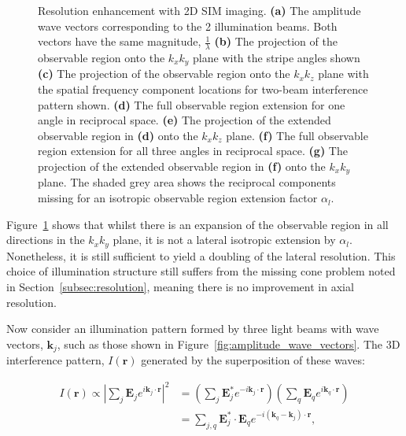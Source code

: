 \begin{figure}
\begin{subfigure}[t]{0.5\textwidth}
		\caption{}
		\label{fig:3D_SIM_OTF_xy_expansion_w_double_rad_filled}
	\end{subfigure}
	\caption[Resolution enhancement with 2D SIM imaging]{Resolution enhancement 
		with 2D SIM imaging. \textbf{(a)} The amplitude wave vectors 
		corresponding to the 2 illumination beams. Both vectors have the 
		same magnitude, $\frac{1}{\lambda}$ \textbf{(b)} The projection of the 
		observable region onto the $k_{x}k_{y}$ plane with the stripe angles 
		shown \textbf{(c)} The projection of the observable region onto the 
		$k_{x}k_{z}$ plane with the spatial frequency component locations for
		two-beam interference pattern shown. \textbf{(d)} The full observable region 
		extension for one angle in reciprocal space. \textbf{(e)} The projection 
		of the extended observable region in \textbf{(d)} onto the $k_{x}k_{z}$ 
		plane. \textbf{(f)} The full observable region extension for all three angles in 
		reciprocal space. \textbf{(g)} The projection of the extended observable 
		region in \textbf{(f)} onto the $k_{x}k_{y}$ plane. The shaded grey area
		shows the reciprocal components missing for an isotropic observable region
		extension factor $\alpha_{l}$.}
	\label{fig:2D_SIM_visualisation}
\end{figure}

Figure~\ref{fig:3D_SIM_OTF_xy_expansion_w_double_rad_filled} shows
that whilst there is an expansion of the observable region in all
directions in the $k_{x}k_{y}$ plane, it is not a lateral isotropic 
extension by $\alpha_{l}$. Nonetheless, it is still sufficient to yield 
a doubling of the lateral resolution\cite{gustafsson2000surpassing}.
This choice of illumination structure still suffers from the missing
cone problem noted in Section~\ref{subsec:resolution}, meaning there
is no improvement in axial resolution.

Now consider an illumination pattern formed by three light beams with
wave vectors, $\textbf{k}_{j}$, such as those shown in 
Figure~\ref{fig:amplitude_wave_vectors}. The 3D interference pattern, 
$I(\textbf{r})$ generated by the superposition of these waves:

\begin{equation}\label{eq:3_beam_interference}
\begin{split}
I(\textbf{r}) \propto \left|\sum\limits_{j}{\textbf{E}_{j}e^{i\textbf{k}_j\cdot\textbf{r}}}\right|^{2} &= \left(\sum\limits_{j}{\textbf{E}^{*}_{j}e^{-i\textbf{k}_{j}\cdot\textbf{r}}}\right)
\left(\sum\limits_{q}{\textbf{E}_{q}e^{i\textbf{k}_{q}\cdot\textbf{r}}}\right)\\
&= \sum\limits_{j,q}{\textbf{E}^{*}_{j}\cdot\textbf{E}_{q}e^{-i\left(\textbf{k}_{q}-\textbf{k}_{j}\right)\cdot\textbf{r}}},
\end{split}
\end{equation}

